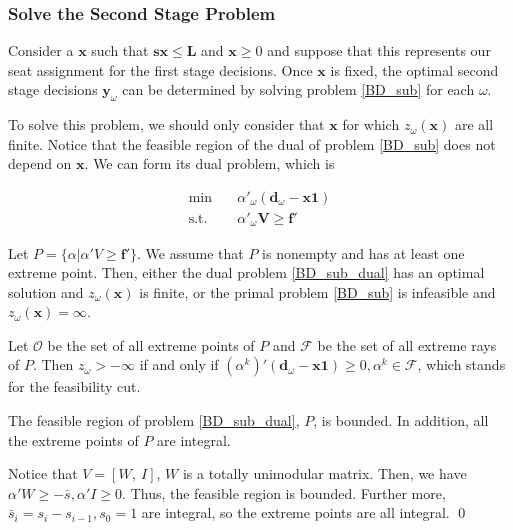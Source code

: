 \subsubsection{Solve the Second Stage Problem}\label{second_stage}

Consider a $\mathbf{x}$ such that $\mathbf{s x} \leq \mathbf{L}$ and $\mathbf{x} \geq 0$ and suppose that this represents our seat assignment for the first stage decisions. Once $\mathbf{x}$ is fixed, the optimal second stage decisions $\mathbf{y}_{\omega}$ can be determined by solving problem \eqref{BD_sub} for each $\omega$.

To solve this problem, we should only consider that $\mathbf{x}$ for which $z_{\omega}(\mathbf{x})$ are all finite. Notice that the feasible region of the dual of problem \eqref{BD_sub} does not depend on $\mathbf{x}$. We can form its dual problem, which is 

\begin{equation}\label{BD_sub_dual}
  \begin{aligned}
    \min \quad & \alpha{'}_{\omega} (\mathbf{d}_{\omega}- \mathbf{x} \mathbf{1}) \\
    \text {s.t.} \quad & \alpha{'}_{\omega} \mathbf{V} \geq \mathbf{f}{'}
  \end{aligned}
  \end{equation}

Let $P = \{\alpha|\alpha{'}V \geq \mathbf{f}{'}\}$. 
We assume that $P$ is nonempty and has at least one extreme point. Then, either the dual problem \eqref{BD_sub_dual} has an optimal solution and $z_{\omega}(\mathbf{x})$ is finite, or the primal problem \eqref{BD_sub} is infeasible and $z_{\omega}(\mathbf{x}) = \infty$.  

Let $\mathcal{O}$ be the set of all extreme points of $P$ and $\mathcal{F}$ be the set of all extreme rays of $P$. Then $z_{\omega} > -\infty$ if and only if $(\alpha^{k}){'}(\mathbf{d}_{\omega}- \mathbf{x} \mathbf{1}) \geq 0, \alpha^{k} \in \mathcal{F}$, which stands for the feasibility cut. 

\begin{lem}\label{feasible_region}
  The feasible region of problem \eqref{BD_sub_dual}, $P$, is bounded. In addition, all the extreme points of $P$ are integral.
\end{lem}

\begin{pf}
Notice that $V =[W,~I]$, $W$ is a totally unimodular matrix. Then, we have $\alpha{'}W \geq -\bar{s}, \alpha{'}I \geq 0$. Thus, the feasible region is bounded.
Further more, $\bar{s}_i = s_i - s_{i-1}, s_0 =1$ are integral, so the extreme points are all integral.
\qed
\end{pf}

